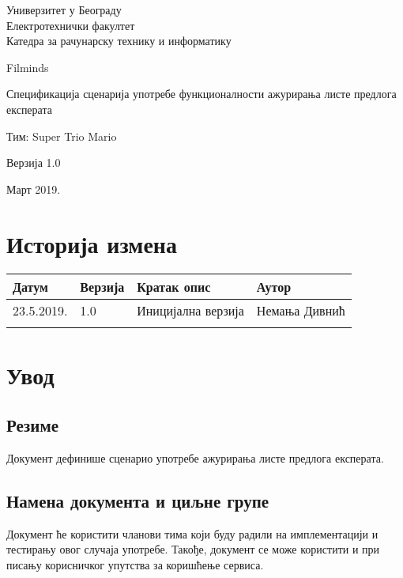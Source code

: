 \documentclass[12pt,a4paper]{article}
\begin{document}
\begin{titlepage}
\begin{center}
  Универзитет у Београду \\
  Електротехнички факултет \\
  Катедра за рачунарску технику и информатику \\
  \vfill

  {\fontsize{50}{60}\selectfont Filminds}
  \vskip 0.6cm

  {\large Спецификација сценарија употребе функционалности ажурирања листе предлога експерата }
  \vskip 0.3cm
  
  {\large Тим: Super Trio Mario}
  \vskip 0.3cm

  {\large Верзија 1.0}

  \vfill
  \vfill

  Март 2019.
\hfill

\end{center}
\end{titlepage}

\section*{Историја измена}
\noindent
\setcellgapes{4pt}
\makegapedcells
\begin{tabularx}{\linewidth}{|l|l|X|X|}
    \hline
    \textbf{Датум} & \textbf{Верзија} & \textbf{Кратак опис} & \textbf{Аутор} \\
    \hline
    23.5.2019. & 1.0 & Иницијална верзија & Немања Дивнић \\
    \hline
    & & & \\
    \hline
\end{tabularx}
\newpage

\tableofcontents
\newpage

\section{Увод}
\subsection{Резиме}
Документ дефинише сценарио употребе ажурирања листе предлога експерата.
\subsection{Намена документа и циљне групе}
Документ ће користити чланови тима који буду радили на имплементацији и тестирању овог случаја употребе. Такође, документ се може користити и при писању корисничког упутства за коришћење сервиса.
\end{document}

